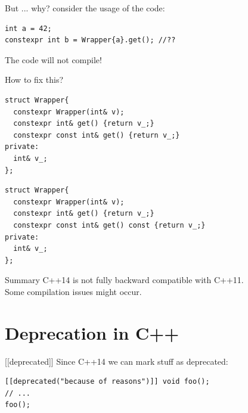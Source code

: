 \documentclass[10pt]{beamer}
\begin{document}
\begin{frame}[fragile]{But ... why?}
	\centering consider the usage of the code:

	\begin{verbatim}
int a = 42;
constexpr int b = Wrapper{a}.get(); //??
	\end{verbatim}

	\pause

	The code will not compile!
\end{frame}

\begin{frame}[fragile]{How to fix this?}
	\begin{verbatim}
struct Wrapper{
  constexpr Wrapper(int& v);
  constexpr int& get() {return v_;}
  constexpr const int& get() {return v_;} 
private:
  int& v_;
};
	\end{verbatim}
\pause
	\begin{verbatim}
struct Wrapper{
  constexpr Wrapper(int& v);
  constexpr int& get() {return v_;}
  constexpr const int& get() const {return v_;} 
private:
  int& v_;
};
	\end{verbatim}
\end{frame}

\begin{frame}{Summary}
	\vfill
	\centering C++14 is not fully backward compatible with C++11.\\
	Some compilation issues might occur.
	\vfill
\end{frame}

\section{Deprecation in C++}
\begin{frame}[fragile]{[[deprecated]]}
    Since C++14 we can mark stuff as deprecated:

    \begin{verbatim}
[[deprecated("because of reasons")]] void foo();
// ...
foo();
    \end{verbatim}

    \vfill

    \begin{block}{\alert{ }}
    \end{block}

\end{frame}
\end{document}

